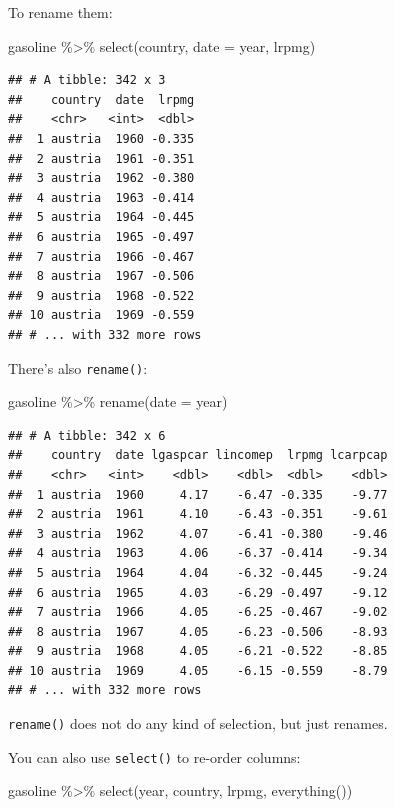 \documentclass[
]{article}
\newenvironment{Shaded}{\begin{snugshade}}{\end{snugshade}}
\newcommand{\AttributeTok}[1]{\textcolor[rgb]{0.77,0.63,0.00}{#1}}
\newcommand{\FunctionTok}[1]{\textcolor[rgb]{0.00,0.00,0.00}{#1}}
\newcommand{\NormalTok}[1]{#1}
\newcommand{\SpecialCharTok}[1]{\textcolor[rgb]{0.00,0.00,0.00}{#1}}
\begin{document}
To rename them:

\begin{Shaded}
\begin{Highlighting}[]
\NormalTok{gasoline }\SpecialCharTok{\%\textgreater{}\%}
  \FunctionTok{select}\NormalTok{(country, }\AttributeTok{date =}\NormalTok{ year, lrpmg)}
\end{Highlighting}
\end{Shaded}

\begin{verbatim}
## # A tibble: 342 x 3
##    country  date  lrpmg
##    <chr>   <int>  <dbl>
##  1 austria  1960 -0.335
##  2 austria  1961 -0.351
##  3 austria  1962 -0.380
##  4 austria  1963 -0.414
##  5 austria  1964 -0.445
##  6 austria  1965 -0.497
##  7 austria  1966 -0.467
##  8 austria  1967 -0.506
##  9 austria  1968 -0.522
## 10 austria  1969 -0.559
## # ... with 332 more rows
\end{verbatim}

There's also \texttt{rename()}:

\begin{Shaded}
\begin{Highlighting}[]
\NormalTok{gasoline }\SpecialCharTok{\%\textgreater{}\%}
  \FunctionTok{rename}\NormalTok{(}\AttributeTok{date =}\NormalTok{ year)}
\end{Highlighting}
\end{Shaded}

\begin{verbatim}
## # A tibble: 342 x 6
##    country  date lgaspcar lincomep  lrpmg lcarpcap
##    <chr>   <int>    <dbl>    <dbl>  <dbl>    <dbl>
##  1 austria  1960     4.17    -6.47 -0.335    -9.77
##  2 austria  1961     4.10    -6.43 -0.351    -9.61
##  3 austria  1962     4.07    -6.41 -0.380    -9.46
##  4 austria  1963     4.06    -6.37 -0.414    -9.34
##  5 austria  1964     4.04    -6.32 -0.445    -9.24
##  6 austria  1965     4.03    -6.29 -0.497    -9.12
##  7 austria  1966     4.05    -6.25 -0.467    -9.02
##  8 austria  1967     4.05    -6.23 -0.506    -8.93
##  9 austria  1968     4.05    -6.21 -0.522    -8.85
## 10 austria  1969     4.05    -6.15 -0.559    -8.79
## # ... with 332 more rows
\end{verbatim}

\texttt{rename()} does not do any kind of selection, but just renames.

You can also use \texttt{select()} to re-order columns:

\begin{Shaded}
\begin{Highlighting}[]
\NormalTok{gasoline }\SpecialCharTok{\%\textgreater{}\%}
  \FunctionTok{select}\NormalTok{(year, country, lrpmg, }\FunctionTok{everything}\NormalTok{())}
\end{Highlighting}
\end{Shaded}
\end{document}
